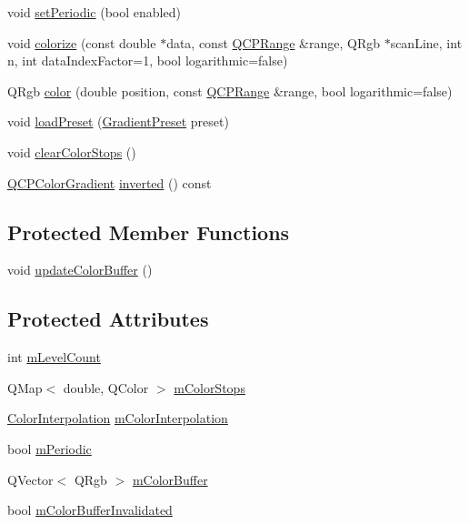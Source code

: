 \begin{DoxyCompactItemize}
\item 
void \hyperlink{class_q_c_p_color_gradient_a39d6448155fc00a219f239220d14bb39}{set\+Periodic} (bool enabled)
\item 
void \hyperlink{class_q_c_p_color_gradient_aaf423ceb943e177b0ed2c48c811d83dc}{colorize} (const double $\ast$data, const \hyperlink{class_q_c_p_range}{Q\+C\+P\+Range} \&range, Q\+Rgb $\ast$scan\+Line, int n, int data\+Index\+Factor=1, bool logarithmic=false)
\item 
Q\+Rgb \hyperlink{class_q_c_p_color_gradient_a0599545c859268b025d2060dea741cea}{color} (double position, const \hyperlink{class_q_c_p_range}{Q\+C\+P\+Range} \&range, bool logarithmic=false)
\item 
void \hyperlink{class_q_c_p_color_gradient_aa0aeec1528241728b9671bf8e60b1622}{load\+Preset} (\hyperlink{class_q_c_p_color_gradient_aed6569828fee337023670272910c9072}{Gradient\+Preset} preset)
\item 
void \hyperlink{class_q_c_p_color_gradient_a939213e85f0d1279519d555c5fcfb6ad}{clear\+Color\+Stops} ()
\item 
\hyperlink{class_q_c_p_color_gradient}{Q\+C\+P\+Color\+Gradient} \hyperlink{class_q_c_p_color_gradient_abe04e1d1ccab3d7aa78f2924faed4916}{inverted} () const 
\end{DoxyCompactItemize}
\subsection*{Protected Member Functions}
\begin{DoxyCompactItemize}
\item 
void \hyperlink{class_q_c_p_color_gradient_a353f15ab3ab586eebf1f6b58c3e2707b}{update\+Color\+Buffer} ()
\end{DoxyCompactItemize}
\subsection*{Protected Attributes}
\begin{DoxyCompactItemize}
\item 
int \hyperlink{class_q_c_p_color_gradient_a98fb68e359904b2c991fcae3e38a211a}{m\+Level\+Count}
\item 
Q\+Map$<$ double, Q\+Color $>$ \hyperlink{class_q_c_p_color_gradient_a9e11a2b0974ef289d12c324822bc3a3e}{m\+Color\+Stops}
\item 
\hyperlink{class_q_c_p_color_gradient_ac5dca17cc24336e6ca176610e7f77fc1}{Color\+Interpolation} \hyperlink{class_q_c_p_color_gradient_a028cef73d863800a9ee93ffd641cce01}{m\+Color\+Interpolation}
\item 
bool \hyperlink{class_q_c_p_color_gradient_a4b07deeb20ca1ee2d5ea7e01bf0420af}{m\+Periodic}
\item 
Q\+Vector$<$ Q\+Rgb $>$ \hyperlink{class_q_c_p_color_gradient_af8b5f0739faa5f8295154d47ce38ecff}{m\+Color\+Buffer}
\item 
bool \hyperlink{class_q_c_p_color_gradient_abacf55e11f67d6722a687af1bb2687bd}{m\+Color\+Buffer\+Invalidated}
\end{DoxyCompactItemize}


